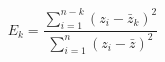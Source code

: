 \documentclass[12pt]{article}
\begin{document}
\pagestyle{empty}
\large
{}
\pagecolor{ehandbook}

\[
E_{k} = \frac{\sum_{i=1}^{n-k}{(z_{i} - \bar{z}_{k})^{2}}}
  {\sum_{i=1}^{n}{(z_{i} - \bar{z})^{2}}}
\]
\end{document}
